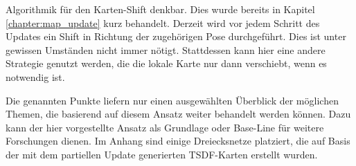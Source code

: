 Algorithmik für den Karten-Shift denkbar. Dies wurde bereits in Kapitel \ref{chapter:map_update} kurz behandelt. Derzeit wird vor jedem Schritt des Updates ein Shift in Richtung der zugehörigen Pose durchgeführt. Dies ist unter gewissen Umständen nicht immer nötigt. Stattdessen kann hier eine andere Strategie genutzt werden, die die lokale Karte nur dann verschiebt, wenn es notwendig ist.

Die genannten Punkte liefern nur einen ausgewählten Überblick der möglichen Themen, die basierend auf diesem Ansatz weiter behandelt werden können. Dazu kann der hier vorgestellte Ansatz als Grundlage oder Base-Line für weitere Forschungen dienen. Im Anhang sind einige Dreiecksnetze platziert, die auf Basis der mit dem partiellen Update generierten TSDF-Karten erstellt wurden.
